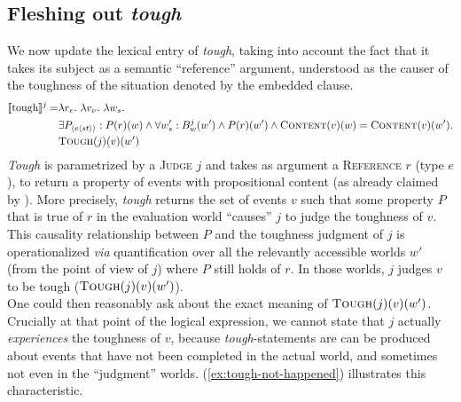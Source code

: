 \documentclass[11pt]{article}
\begin{document}
\subsection{Fleshing out \textit{tough}}
We now update the lexical entry of \textit{tough}, taking into account the fact that it takes its subject as a semantic ``reference'' argument, understood as the causer of the toughness of the situation denoted by the embedded clause.
\begin{align*}
	\llbracket\text{tough}\rrbracket^j = &\lambda r_e . \ \lambda v_\nu . \ \lambda w_s . \\
	&\exists P_{\langle e \langle st \rangle \rangle}: P(r)(w) \wedge \forall w'_s:  B^{j}_{w}(w') \wedge P(r)(w') \wedge \textsc{Content}(v)(w) = \textsc{Content}(v)(w').\\
	&\text{\textsc{Tough}}(j)(v)(w')
\end{align*}
\textit{Tough} is parametrized by a \textsc{Judge} $j$ and takes as argument a \textsc{Reference} $r$ (type $e$), to return a property of events with propositional content (as already claimed by \cite{Gluckman2021}). More precisely, \textit{tough} returns the set of events $v$ such that some property $P$ that is true of $r$ in the evaluation world ``causes'' $j$ to judge the toughness of $v$. This causality relationship between $P$ and the toughness judgment of $j$ is operationalized \textit{via} quantification over all the relevantly accessible worlds $w'$ (from the point of view of $j$) where $P$ still holds of $r$. In those worlds, $j$ judges $v$ to be tough ($\textsc{Tough}(j)(v)(w')$).\\

One could then reasonably ask about the exact meaning of $\textsc{Tough}(j)(v)(w')$. Crucially at that point of the logical expression, we cannot state that $j$ actually \textit{experiences} the toughness of $v$, because \textit{tough}-statements are can be produced about events that have not been completed in the actual world, and sometimes not even in the ``judgment'' worlds. (\ref{ex:tough-not-happened}) illustrates this characteristic.
\begin{exe}
	\ex 
	\begin{xlist}
	\end{xlist}
\end{exe}\label{ex:tough-not-happened}
\end{document}
